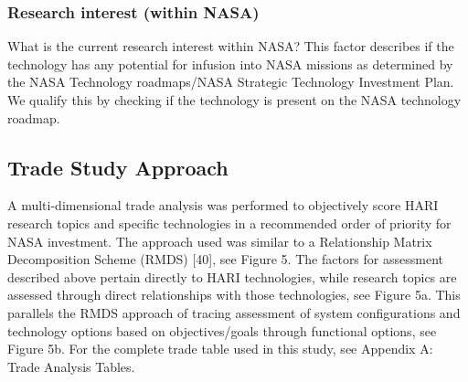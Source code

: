 \subsubsection{Research interest (within NASA)}
What is the current research interest within NASA? This factor describes if the technology has any potential for infusion into NASA missions as determined by the NASA Technology roadmaps/NASA Strategic Technology Investment Plan. We qualify this by checking if the technology is present on the NASA technology roadmap.

\subsection{Trade Study Approach}
A multi-dimensional trade analysis was performed to objectively score HARI research topics and specific technologies in a recommended order of priority for NASA investment. The approach used was similar to a Relationship Matrix Decomposition Scheme (RMDS) [40], see Figure 5. The factors for assessment described above pertain directly to HARI technologies, while research topics are assessed through direct relationships with those technologies, see Figure 5a. This parallels the RMDS approach of tracing assessment of system configurations and technology options based on objectives/goals through functional options, see Figure 5b. For the complete trade table used in this study, see Appendix A: Trade Analysis Tables.

